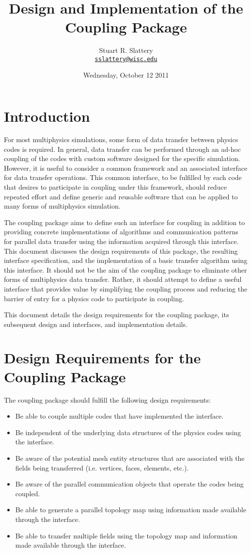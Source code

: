 \documentclass[letterpaper]{article}
\author{Stuart R. Slattery
  \\ \href{mailto:sslattery@wisc.edu}{\texttt{sslattery@wisc.edu}}
}
\date{Wednesday, October 12 2011}
\title{Design and Implementation of the Coupling Package}
\begin{document}
\maketitle

\section{Introduction}
For most multiphysics simulations, some form of data transfer between
physics codes is required. In general, data transfer can be performed
through an ad-hoc coupling of the codes with custom software designed
for the specific simulation. However, it is useful to consider a
common framework and an associated interface for data transfer
operations. This common interface, to be fulfilled by each code that
desires to participate in coupling under this framework, should reduce
repeated effort and define generic and reusable software that can be
applied to many forms of multiphysics simulation.

The coupling package aims to define such an interface for coupling in
addition to providing concrete implementations of algorithms and
communication patterns for parallel data transfer using the
information acquired through this interface. This document discusses
the design requirements of this package, the resulting interface
specification, and the implementation of a basic transfer algorithm
using this interface. It should not be the aim of the coupling package
to eliminate other forms of multiphysics data transfer. Rather, it
should attempt to define a useful interface that provides value by
simplifying the coupling process and reducing the barrier of entry for
a physics code to participate in coupling.

This document details the design requirements for the coupling
package, its subsequent design and interfaces, and implementation
details.

\section{Design Requirements for the Coupling Package}
The coupling package should fulfill the following design
requirements:

\begin{itemize}
\item Be able to couple multiple codes that have implemented the
  interface.
\item Be independent of the underlying data structures of the physics
  codes using the interface.
\item Be aware of the potential mesh entity structures that are
  associated with the fields being transferred (i.e. vertices, faces,
  elements, etc.).
\item Be aware of the parallel communication objects that operate the
  codes being coupled.
\item Be able to generate a parallel topology map using information
  made available through the interface.
\item Be able to transfer multiple fields using the topology map and
  information made available through the interface.
\end{itemize}
\end{document}
